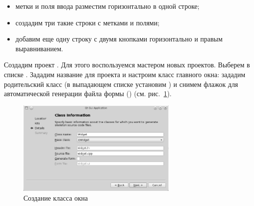 \begin{itemize}
\item метки и поля ввода разместим горизонтально в одной строке;
\item создадим три такие строки с метками и полями;
\item добавим еще одну строку с двумя кнопками горизонтально и правым выравниванием.
\end{itemize}

Создадим проект . Для этого воспользуемся
мастером новых проектов. Выберем в списке . Зададим название для
проекта и настроим класс главного окна: зададим родительский класс (в выпадающем списке  установим
) и снимем флажок для автоматической генерации файла формы () 
(см. рис.~\ref{ch13:refDrawing3}).

\begin{figure}[htb]
\begin{center}
\includegraphics[width=0.7\textwidth]{img/ris_13_4}
\caption[Создание класса окна]{Создание класса окна}
\label{ch13:refDrawing3}
\end{center}
\end{figure}

